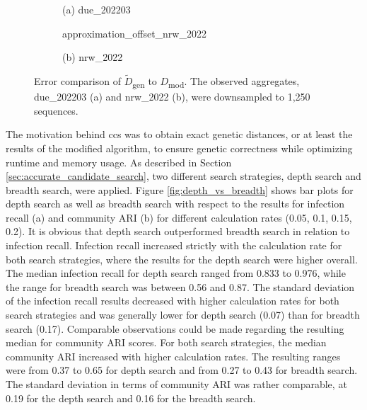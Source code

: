 \begin{figure}[H]
  \centering
  \begin{subfigure}[b]{0.45\textwidth}
    
    \caption*{(a) due\_202203}
  \end{subfigure}
  \hfill
  \begin{subfigure}[b]{0.45\textwidth}
        {approximation_offset_nrw_2022}
    \caption*{(b) nrw\_2022}
  \end{subfigure}
  \caption[Error comparison of $\tilde{D}$\textsubscript{gen} to $D$\textsubscript{mod}]{Error comparison of $\tilde{D}$\textsubscript{gen} to $D$\textsubscript{mod}. The observed aggregates, due\_202203 (a) and nrw\_2022 (b), were downsampled to 1,250 sequences.}
  \label{fig:approximation_offset}
\end{figure}

The motivation behind \acrshort{ccs} was to obtain exact genetic distances, or at least the results of the modified algorithm, to ensure genetic correctness while optimizing runtime and memory usage. As described in Section \ref{sec:accurate_candidate_search}, two different search strategies, depth search and breadth search, were applied.
Figure \ref{fig:depth_vs_breadth} shows bar plots for depth search as well as breadth search with respect to the results for infection recall (a) and community ARI (b) for different calculation rates (0.05, 0.1, 0.15, 0.2). It is obvious that depth search outperformed breadth search in relation to infection recall. Infection recall increased strictly with the calculation rate for both search strategies, where the results for the depth search were higher overall. The median infection recall for depth search ranged from 0.833 to 0.976, while the range for breadth search was between 0.56 and 0.87. The standard deviation of the infection recall results decreased with higher calculation rates for both search strategies and was generally lower for depth search (0.07) than for breadth search (0.17). Comparable observations could be made regarding the resulting median for community ARI scores. For both search strategies, the median community ARI increased with higher calculation rates. The resulting ranges were from 0.37 to 0.65 for depth search and from 0.27 to 0.43 for breadth search. The standard deviation in terms of community ARI was rather comparable, at 0.19 for the depth search and 0.16 for the breadth search.

